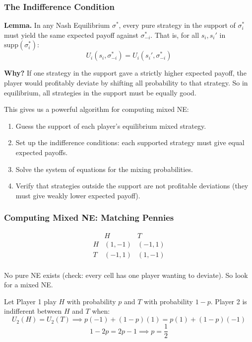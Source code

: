 \documentclass[hidelinks]{article}
\begin{document}
\subsubsection{The Indifference Condition}

\textbf{Lemma.} In any Nash Equilibrium $\sigma^*$, every pure strategy in the support of $\sigma_i^*$ must yield the same expected payoff against $\sigma_{-i}^*$. That is, for all $s_i, s_i'$ in $\mathrm{supp}(\sigma_i^*)$:
\[
U_i(s_i, \sigma_{-i}^*) = U_i(s_i', \sigma_{-i}^*)
\]

\textbf{Why?} If one strategy in the support gave a strictly higher expected payoff, the player would profitably deviate by shifting all probability to that strategy. So in equilibrium, all strategies in the support must be equally good.

This gives us a powerful algorithm for computing mixed NE:

\begin{enumerate}
    \item Guess the support of each player's equilibrium mixed strategy.
    \item Set up the indifference conditions: each supported strategy must give equal expected payoffs.
    \item Solve the system of equations for the mixing probabilities.
    \item Verify that strategies outside the support are not profitable deviations (they must give weakly lower expected payoff).
\end{enumerate}

\subsubsection{Computing Mixed NE: Matching Pennies}

\[
\begin{array}{c|cc}
 & H & T \\
\hline
H & (1,-1) & (-1,1) \\
T & (-1,1) & (1,-1) \\
\end{array}
\]

No pure NE exists (check: every cell has one player wanting to deviate). So look for a mixed NE.

Let Player 1 play $H$ with probability $p$ and $T$ with probability $1-p$. Player 2 is indifferent between $H$ and $T$ when:
\[
U_2(H) = U_2(T) \implies p(-1) + (1-p)(1) = p(1) + (1-p)(-1)
\]
\[
1 - 2p = 2p - 1 \implies p = \frac{1}{2}
\]
\end{document}
